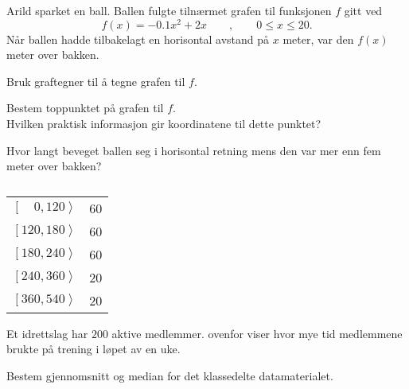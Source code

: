 Arild sparket en ball. Ballen fulgte tilnærmet grafen til funksjonen $f$ gitt ved
%
\begin{equation*}
  f(x) = \num{-0.1}x^2 + 2x \qquad , \qquad 0 \leq x \leq 20.
\end{equation*}
%
Når ballen hadde tilbakelagt en horisontal avstand på $x$ meter, var den $f(x)$
meter over bakken.

\begin{oppgaver}
   Bruk graftegner til å tegne grafen til $f$.
\end{oppgaver}

\begin{oppgaver}
   Bestem toppunktet på grafen til $f$. \\
    Hvilken praktisk informasjon gir koordinatene til dette punktet?
\end{oppgaver}

\begin{oppgaver}
   Hvor langt beveget ballen seg i horisontal retning mens den var mer
    enn fem meter over bakken?
\end{oppgaver}


\Oppgave[4] 

\begin{table}[H]
  \centering
  \caption{}
  \label{tab:Forkurs-1p-2p-laererutdanning-2018-V-U-oppgave-2-2}
  \begin{tabular}{|l | S[table-format=2.0]|}
    $\left[\phantom{00}0,120\right\rangle$ & 60 \\
    $\left[120,180\right\rangle$ & 60 \\
    $\left[180,240\right\rangle$ & 60 \\
    $\left[240,360\right\rangle$ & 20 \\
    $\left[360,540\right\rangle$ & 20 \\
    \hline
  \end{tabular}
\end{table}

Et idrettslag har $200$ aktive medlemmer.
 ovenfor viser hvor
mye tid medlemmene brukte på trening i løpet av en uke. \bigskip

Bestem gjennomsnitt og median for det klassedelte datamaterialet.



